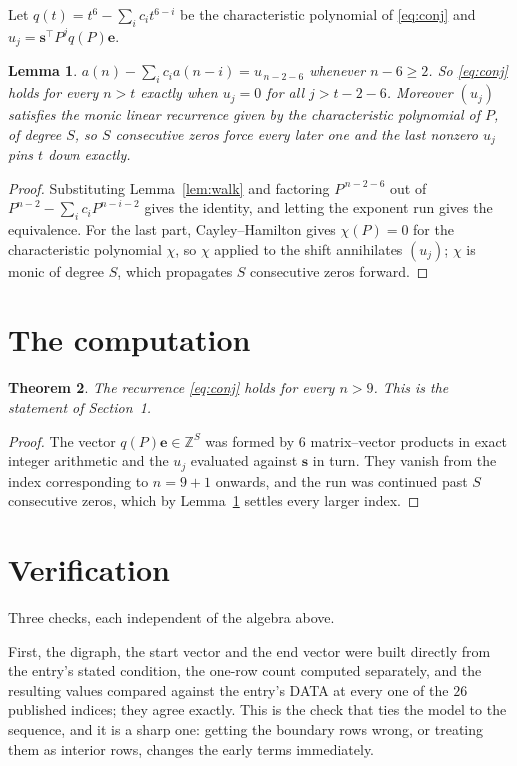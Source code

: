 \documentclass[11pt,a4paper]{article}
\theoremstyle{plain}
\newtheorem{theorem}{Theorem}
\newtheorem{lemma}[theorem]{Lemma}
\theoremstyle{definition}
\begin{document}
Let $q(t)=t^{6}-\sum_i c_i t^{6-i}$ be the characteristic polynomial of
\eqref{eq:conj} and $u_j=\mathbf{s}^{\!\top}P^{j}q(P)\mathbf{e}$.

\begin{lemma}\label{lem:crit}
$a(n)-\sum_i c_i a(n-i)=u_{\,n-2-6}$ whenever $n-6\ge2$. So \eqref{eq:conj}
holds for every $n>t$ exactly when $u_j=0$ for all $j>t-2-6$. Moreover $(u_j)$
satisfies the monic linear recurrence given by the characteristic polynomial of $P$, of
degree $S$, so $S$ consecutive zeros force every later one and the last nonzero $u_j$ pins
$t$ down exactly.
\end{lemma}

\begin{proof}
Substituting Lemma~\ref{lem:walk} and factoring $P^{\,n-2-6}$ out of
$P^{n-2}-\sum_i c_i P^{n-i-2}$ gives the identity, and letting the exponent run gives the
equivalence. For the last part, Cayley--Hamilton gives $\chi(P)=0$ for the characteristic
polynomial $\chi$, so $\chi$ applied to the shift annihilates $(u_j)$; $\chi$ is monic of
degree $S$, which propagates $S$ consecutive zeros forward.
\end{proof}

\section{The computation}

\begin{theorem}
The recurrence \eqref{eq:conj} holds for every $n>9$. This is the statement of
Section~1.
\end{theorem}

\begin{proof}
The vector $q(P)\mathbf{e}\in\mathbb{Z}^{S}$ was formed by $6$ matrix--vector
products in exact integer arithmetic and the $u_j$ evaluated against $\mathbf{s}$ in turn.
They vanish from the index corresponding to $n=9+1$ onwards, and the run was continued
past $S$ consecutive zeros, which by Lemma~\ref{lem:crit} settles every larger index.
\end{proof}

\section{Verification}

Three checks, each independent of the algebra above.

First, the digraph, the start vector and the end vector were built directly from the
entry's stated condition, the one-row count computed separately, and the resulting values
compared against the entry's DATA at every one of the $26$ published indices; they
agree exactly. This is the check that ties the model to the sequence, and it is a sharp one:
getting the boundary rows wrong, or treating them as interior rows, changes the early terms
immediately.
\end{document}
